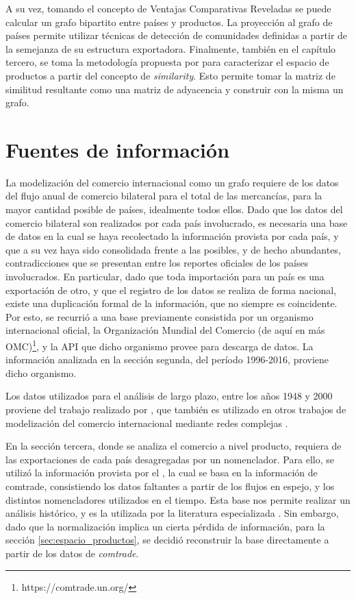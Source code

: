 \documentclass[class=article, crop=false]{standalone}
\begin{document}
A su vez, tomando el concepto de Ventajas Comparativas Reveladas \citep{balassa1965trade} se puede calcular un grafo bipartito entre países y productos. La proyección al grafo de países permite utilizar técnicas de detección de comunidades definidas a partir de la semejanza de su estructura exportadora. Finalmente, también en el capítulo tercero, se toma la metodología propuesta por \cite{Hidalgo2009} para caracterizar el espacio de productos a partir del concepto de \textit{similarity}. Esto permite tomar la matriz de similitud resultante como una matriz de adyacencia y construir con la misma un grafo. 



\section{Fuentes de información}


La modelización del comercio internacional como un grafo requiere de los datos del flujo anual de comercio bilateral para el total de las mercancías, para la mayor cantidad posible de países, idealmente todos ellos. Dado que los datos del comercio bilateral son realizados por cada país involucrado, es necesaria una base de datos en la cual se haya recolectado la información provista por cada país, y que a su vez haya sido consolidada frente a las posibles, y de hecho abundantes, contradicciones que se presentan entre los reportes oficiales de los países involucrados. En particular, dado que toda importación para un país es una exportación de otro, y que el registro de los datos se realiza de forma nacional, existe una duplicación formal de la información, que no siempre es coincidente. Por esto, se recurrió a una base previamente consistida por un organismo internacional oficial, la Organización Mundial del Comercio (de aquí en más OMC)\footnote{https://comtrade.un.org/}, y la API que dicho organismo provee para descarga de datos. La información analizada  en la sección segunda, del período 1996-2016, proviene dicho organismo.

Los datos utilizados para el análisis de largo plazo, entre los años 1948 y 2000 proviene del trabajo realizado por \cite{Gleditsch2002}, que también es utilizado en otros trabajos de modelización del comercio internacional mediante redes complejas \cite{Fagiolo2010}.

En la sección tercera, donde se analiza el comercio a nivel producto, requiera de las exportaciones de cada país desagregadas por un nomenclador. Para ello, se utilizó la información provista por el \cite{CenterforInternationalDevelopmentatHarvardUniversity}, la cual se basa en la información de comtrade, consistiendo los datos faltantes a partir de los flujos en espejo, y los distintos nomencladores utilizados en el tiempo. Esta base nos permite realizar un análisis histórico, y es la utilizada por la literatura especializada \citep{Hidalgo2007, Hidalgo2009, Hidalgo2009a}. Sin embargo, dado que la normalización implica un cierta pérdida de información, para la sección \ref{sec:espacio_productos}, se decidió reconstruir la base directamente a partir de los datos de \textit{comtrade}.
\end{document}

